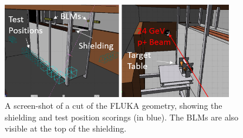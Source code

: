 \begin{figure}[!ht]
	\centering
	\includegraphics[width=0.9\textwidth]{./images/fluka_charm_shielding_ann2}
	\caption{A screen-shot of a cut of the FLUKA geometry, showing the shielding and test position scorings (in blue). The BLMs are also visible at the top of the shielding.}
	\label{fig:fluka_screenshot}
\end{figure}

